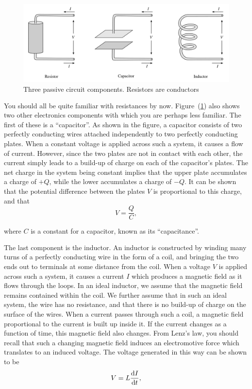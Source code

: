 \begin{figure}[!htb]
    \centering
    \includegraphics[width=\textwidth]{figs/electronics-circuits/electronics-components.png}
    \caption{Three passive circuit components. Resistors are conductors  }
    \label{fig:electronics-components}
\end{figure}



You should all be quite familiar with resistances by now. Figure~(\ref{fig:electronics-components}) also shows two other electronics components with which you are perhaps less familiar. The first of these is a ``capacitor''. As shown in the figure, a capacitor consists of two perfectly conducting wires attached independently to two perfectly conducting plates. When a constant voltage is applied across such a system, it causes a flow of current. However, since the two plates are not in contact with each other, the current simply leads to a build-up of charge on each of the capacitor's plates. The net charge in the system being constant implies that the upper plate accumulates a charge of $+Q$, while the lower accumulates a charge of $-Q$. It can be shown that the potential difference between the plates $V$ is proportional to this charge, and that 
\begin{equation}
    V = \frac{Q}{C},
    \label{eqn:def-cap}
\end{equation}

where $C$ is a constant for a capacitor, known as its ``capacitance''.

The last component is the inductor. An inductor is constructed by winding many turns of a perfectly conducting wire in the form of a coil, and bringing the two ends out to terminals at some distance from the coil. When a voltage $V$ is applied across such a system, it causes a current $I$ which produces a magnetic field as it flows through the loops. In an ideal inductor, we assume that the magnetic field remains contained within the coil. We further assume that in such an ideal system, the wire has no resistance, and that there is no build-up of charge on the surface of the wires. When a current passes through such a coil, a magnetic field proportional to the current is built up inside it. If the current changes as a function of time, this magnetic field also changes. From Lenz's law, you should recall that such a changing magnetic field induces an electromotive force which translates to an induced voltage. The voltage generated in this way can be shown to be 
\begin{equation}
    V = L \dv{I}{t},
    \label{eqn:def-ind}
\end{equation}


